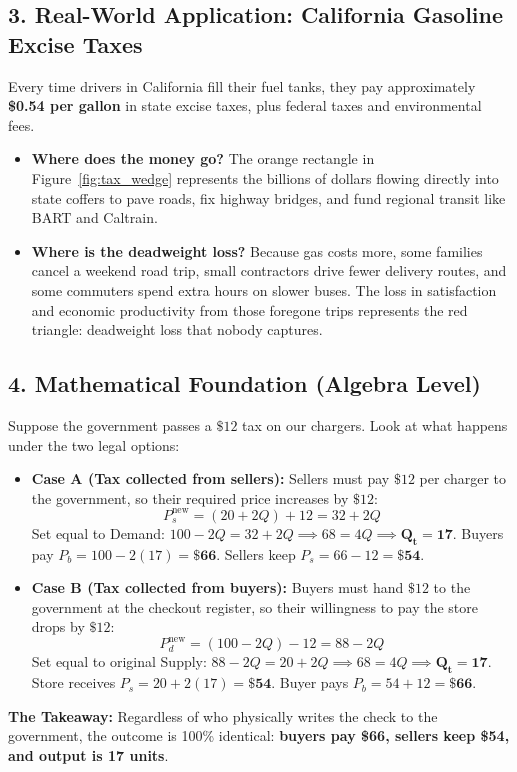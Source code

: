 \documentclass[11pt,letterpaper]{article}
\begin{document}
\subsection*{3. Real-World Application: California Gasoline Excise Taxes}
Every time drivers in California fill their fuel tanks, they pay approximately \textbf{\$0.54 per gallon} in state excise taxes, plus federal taxes and environmental fees. 
\begin{itemize}
    \item \textbf{Where does the money go?} The orange rectangle in Figure~\ref{fig:tax_wedge} represents the billions of dollars flowing directly into state coffers to pave roads, fix highway bridges, and fund regional transit like BART and Caltrain.
    \item \textbf{Where is the deadweight loss?} Because gas costs more, some families cancel a weekend road trip, small contractors drive fewer delivery routes, and some commuters spend extra hours on slower buses. The loss in satisfaction and economic productivity from those foregone trips represents the red triangle: deadweight loss that nobody captures.
\end{itemize}

\subsection*{4. Mathematical Foundation (Algebra Level)}

\begin{tcolorbox}[colback=green!10!white,colframe=green!60!black,title=\textbf{Key Concept: Statutory Neutrality (Who Pays Doesn't Matter!)}]
Suppose the government passes a $\$12$ tax on our chargers. Look at what happens under the two legal options:
\begin{itemize}
    \item \textbf{Case A (Tax collected from sellers):} Sellers must pay $\$12$ per charger to the government, so their required price increases by $\$12$:
    \[
    P_s^{\text{new}} = (20 + 2Q) + 12 = 32 + 2Q
    \]
    Set equal to Demand: $100 - 2Q = 32 + 2Q \implies 68 = 4Q \implies \mathbf{Q_t = 17}$. 
    Buyers pay $P_b = 100 - 2(17) = \mathbf{\$66}$. Sellers keep $P_s = 66 - 12 = \mathbf{\$54}$.
    
    \item \textbf{Case B (Tax collected from buyers):} Buyers must hand $\$12$ to the government at the checkout register, so their willingness to pay the store drops by $\$12$:
    \[
    P_d^{\text{new}} = (100 - 2Q) - 12 = 88 - 2Q
    \]
    Set equal to original Supply: $88 - 2Q = 20 + 2Q \implies 68 = 4Q \implies \mathbf{Q_t = 17}$.
    Store receives $P_s = 20 + 2(17) = \mathbf{\$54}$. Buyer pays $P_b = 54 + 12 = \mathbf{\$66}$.
\end{itemize}
\textbf{The Takeaway:} Regardless of who physically writes the check to the government, the outcome is 100\% identical: \textbf{buyers pay \$66, sellers keep \$54, and output is 17 units}.
\end{tcolorbox}
\end{document}
